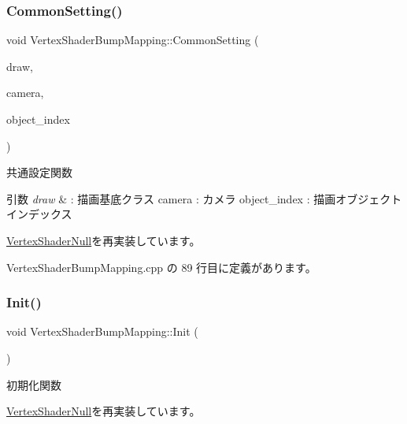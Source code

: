 \subsubsection{\texorpdfstring{Common\+Setting()}{CommonSetting()}}
{\footnotesize\ttfamily void Vertex\+Shader\+Bump\+Mapping\+::\+Common\+Setting (\begin{DoxyParamCaption}\item[{\mbox{\hyperlink{class_draw_base}{Draw\+Base}} $\ast$}]{draw,  }\item[{\mbox{\hyperlink{class_camera}{Camera}} $\ast$}]{camera,  }\item[{unsigned}]{object\+\_\+index }\end{DoxyParamCaption})\hspace{0.3cm}{\ttfamily [virtual]}}



共通設定関数 


\begin{DoxyParams}{引数}
{\em draw} & \+: 描画基底クラス camera \+: カメラ object\+\_\+index \+: 描画オブジェクトインデックス \\
\hline
\end{DoxyParams}


\mbox{\hyperlink{class_vertex_shader_null_a95f1a66045fb39c42cf0566f1990b6a1}{Vertex\+Shader\+Null}}を再実装しています。



 Vertex\+Shader\+Bump\+Mapping.\+cpp の 89 行目に定義があります。

\mbox{\label{class_vertex_shader_bump_mapping_a6c0f59d1f29fd883943a66bfe61b6b03}} 
\subsubsection{\texorpdfstring{Init()}{Init()}}
{\footnotesize\ttfamily void Vertex\+Shader\+Bump\+Mapping\+::\+Init (\begin{DoxyParamCaption}{ }\end{DoxyParamCaption})\hspace{0.3cm}{\ttfamily [virtual]}}



初期化関数 



\mbox{\hyperlink{class_vertex_shader_null_af30eb8057fe0537bc6ade214647b6fb5}{Vertex\+Shader\+Null}}を再実装しています。



